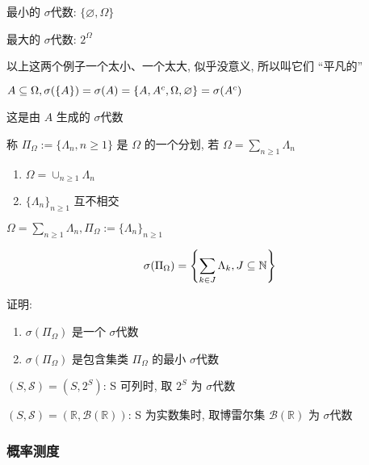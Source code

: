 \begin{example}
    最小的 $\sigma$代数: $\{\varnothing, \Omega\}$ 

    最大的 $\sigma$代数: $2^{\Omega}$
\end{example}

以上这两个例子一个太小、一个太大, 似乎没意义, 所以叫它们 “平凡的”

\begin{example}
    $A\subseteq \Omega, \sigma(\{A\})=\sigma(A)=\{A, A^c, \Omega, \varnothing\}=\sigma(A^c)$

    这是由 $A$ 生成的 $\sigma$代数
\end{example}

\begin{definition}[划分/分割]\label{def:partition}
    称 $\Pi_{\Omega}:= \{\Lambda_n, n\geq 1\}$ 是 $\Omega$ 的一个分划, 若 $\Omega=\sum_{n\geq 1}\Lambda_n$

    \begin{enumerate}
        \item $\Omega=\cup_{n\geq 1}\Lambda_n$
        \item $\{\Lambda_n\}_{n\geq 1}$ 互不相交
    \end{enumerate}
\end{definition}

\begin{example}
    $\Omega=\sum_{n\geq 1}\Lambda_n, \Pi_{\Omega}:=\{\Lambda_n\}_{n\geq 1}$

    \[
    \sigma(\Pi_{\Omega})=\left \{\sum_{k\in J}\Lambda_k, J\subseteq \mathbb{N}\right \}
    \]
\end{example}

\begin{problem}[作业1-1]
    证明: \begin{enumerate}
        \item $\sigma(\Pi_{\Omega})$ 是一个 $\sigma$代数
        \item $\sigma(\Pi_{\Omega})$ 是包含集类 $\Pi_{\Omega}$ 的最小 $\sigma$代数
    \end{enumerate}
\end{problem}


$(S,\mathcal{S})=(S,2^S)$: S 可列时, 取 $2^S$ 为 $\sigma$代数

$(S,\mathcal{S})=(\mathbb{R},\mathcal{B}(\mathbb{R}))$: S 为实数集时, 取博雷尔集 $\mathcal{B}(\mathbb{R})$ 为 $\sigma$代数


\subsubsection{概率测度}

